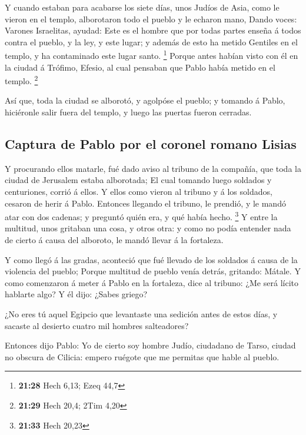  Y cuando estaban para acabarse los siete días, unos Judíos
de Asia, como le vieron en el templo, alborotaron todo el pueblo y le
echaron mano,  Dando voces: Varones Israelitas, ayudad:
Este es el hombre que por todas partes enseña á todos contra el pueblo,
y la ley, y este lugar; y además de esto ha metido Gentiles en el
templo, y ha contaminado este lugar santo. \footnote{\textbf{21:28} Hech
  6,13; Ezeq 44,7}  Porque antes habían visto con él en la
ciudad á Trófimo, Efesio, al cual pensaban que Pablo había metido en el
templo. \footnote{\textbf{21:29} Hech 20,4; 2Tim 4,20}

 Así que, toda la ciudad se alborotó, y agolpóse el pueblo;
y tomando á Pablo, hiciéronle salir fuera del templo, y luego las
puertas fueron cerradas.

\hypertarget{captura-de-pablo-por-el-coronel-romano-lisias}{%
\subsection{Captura de Pablo por el coronel romano
Lisias}\label{captura-de-pablo-por-el-coronel-romano-lisias}}

 Y procurando ellos matarle, fué dado aviso al tribuno de
la compañía, que toda la ciudad de Jerusalem estaba alborotada;
 El cual tomando luego soldados y centuriones, corrió á
ellos. Y ellos como vieron al tribuno y á los soldados, cesaron de herir
á Pablo.  Entonces llegando el tribuno, le prendió, y le
mandó atar con dos cadenas; y preguntó quién era, y qué había hecho.
\footnote{\textbf{21:33} Hech 20,23}  Y entre la multitud,
unos gritaban una cosa, y otros otra: y como no podía entender nada de
cierto á causa del alboroto, le mandó llevar á la fortaleza.

 Y como llegó á las gradas, aconteció que fué llevado de
los soldados á causa de la violencia del pueblo;  Porque
multitud de pueblo venía detrás, gritando: Mátale.  Y como
comenzaron á meter á Pablo en la fortaleza, dice al tribuno: ¿Me será
lícito hablarte algo? Y él dijo: ¿Sabes griego?

 ¿No eres tú aquel Egipcio que levantaste una sedición
antes de estos días, y sacaste al desierto cuatro mil hombres
salteadores?

 Entonces dijo Pablo: Yo de cierto soy hombre Judío,
ciudadano de Tarso, ciudad no obscura de Cilicia: empero ruégote que me
permitas que hable al pueblo.


